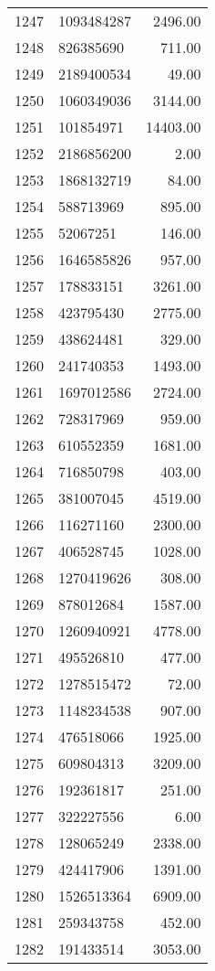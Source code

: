 \begin{table}[ht]
\begin{tabular}{rlr}
  1247 & 1093484287 & 2496.00 \\ 
  1248 & 826385690 & 711.00 \\ 
  1249 & 2189400534 & 49.00 \\ 
  1250 & 1060349036 & 3144.00 \\ 
  1251 & 101854971 & 14403.00 \\ 
  1252 & 2186856200 & 2.00 \\ 
  1253 & 1868132719 & 84.00 \\ 
  1254 & 588713969 & 895.00 \\ 
  1255 & 52067251 & 146.00 \\ 
  1256 & 1646585826 & 957.00 \\ 
  1257 & 178833151 & 3261.00 \\ 
  1258 & 423795430 & 2775.00 \\ 
  1259 & 438624481 & 329.00 \\ 
  1260 & 241740353 & 1493.00 \\ 
  1261 & 1697012586 & 2724.00 \\ 
  1262 & 728317969 & 959.00 \\ 
  1263 & 610552359 & 1681.00 \\ 
  1264 & 716850798 & 403.00 \\ 
  1265 & 381007045 & 4519.00 \\ 
  1266 & 116271160 & 2300.00 \\ 
  1267 & 406528745 & 1028.00 \\ 
  1268 & 1270419626 & 308.00 \\ 
  1269 & 878012684 & 1587.00 \\ 
  1270 & 1260940921 & 4778.00 \\ 
  1271 & 495526810 & 477.00 \\ 
  1272 & 1278515472 & 72.00 \\ 
  1273 & 1148234538 & 907.00 \\ 
  1274 & 476518066 & 1925.00 \\ 
  1275 & 609804313 & 3209.00 \\ 
  1276 & 192361817 & 251.00 \\ 
  1277 & 322227556 & 6.00 \\ 
  1278 & 128065249 & 2338.00 \\ 
  1279 & 424417906 & 1391.00 \\ 
  1280 & 1526513364 & 6909.00 \\ 
  1281 & 259343758 & 452.00 \\ 
  1282 & 191433514 & 3053.00 \\ 

\end{tabular}
\end{table}
